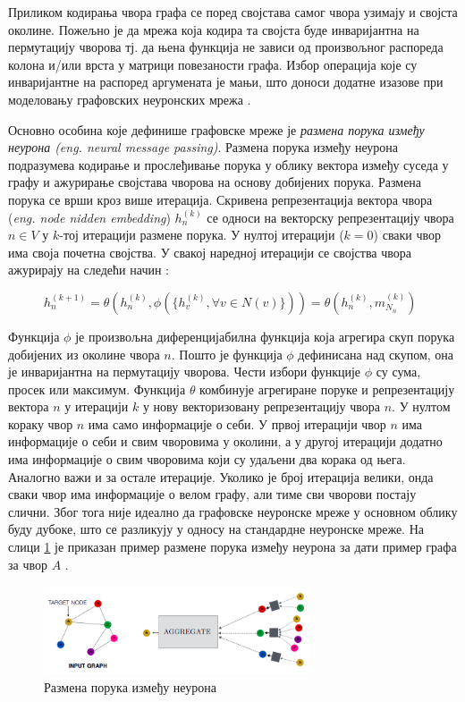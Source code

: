 \documentclass[11pt,oneside]{memoir}
\begin{document}
Приликом кодирања чвора графа се поред својстава самог чвора узимају и својста околине. Пожељно је да мрежа која кодира та својста
буде инваријантна на пермутацију чворова тј. да њена функција не зависи од произвољног распореда колона и/или врста у матрици повезаности графа. Избор
операција које су инваријантне на распоред аргумената је мањи, што доноси додатне изазове при моделовању графовских неуронских мрежа \cite{grl}.

Основно особина које дефинише графовске мреже је \textit{размена порука између неурона (eng. neural message passing)}. Размена порука између неурона
подразумева кодирање и прослеђивање порука у облику вектора између суседа у графу и ажурирање својстава чворова на основу добијених порука. Размена
порука се врши кроз више итерација. Скривена репрезентација вектора чвора (\textit{eng. node nidden embedding}) $h^{(k)}_n$ се односи на 
векторску репрезентацију чвора $n \in V$ у $k$-тој итерацији размене порука. У нултој итерацији ($k=0$) сваки чвор има своја почетна својства. У 
свакој наредној итерацији се својства чвора ажурирају на следећи начин \cite{grl}:

\begin{figure}[H]
  \centering
  $h^{(k+1)}_n = \theta (h^{(k)}_n, \phi (\{h^{(k)}_v, \forall v \in N(v)\})) = \theta (h^{(k)}_n, m^{(k)}_{N_{n}})$
\end{figure}

Функција $\phi$ је произвољна диференцијабилна функција која агрегира скуп порука добијених из околине чвора $n$. Пошто је функција $\phi$
дефинисана над скупом, она је инваријантна на пермутацију чворова. Чести избори функције $\phi$ су сума, просек или максимум. 
Функција $\theta$ комбинује агрегиране поруке и репрезентацију вектора $n$ у
итерацији $k$ у нову векторизовану репрезентацију чвора $n$. У нултом кораку чвор $n$ има само информације о себи. У првој итерацији чвор $n$ има
информације о себи и свим чворовима у околини, а у другој итерацији додатно има информације о свим чворовима који су удаљени два корака од њега. 
Аналогно важи и за остале итерације. Уколико је број итерација велики, онда сваки чвор има информације о велом графу, али тиме сви чворови постају
слични. Због тога није идеално да графовске неуронске мреже у основном облику буду дубоке, што се разликују у односу на стандардне неуронске
мреже. На слици \ref{nmp} је приказан пример размене порука између неурона за дати пример графа за чвор $A$ \cite{grl}. 

\begin{figure}[H]
  \centering
  \includegraphics[width=0.7\textwidth]{images/nmp.png}
  \caption{Размена порука између неурона \label{nmp}}
\end{figure}
\end{document}
